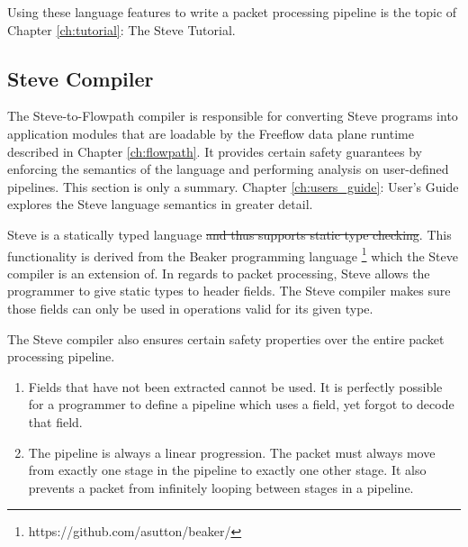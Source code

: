 Using these language features to write a packet processing pipeline is the topic of Chapter \ref{ch:tutorial}: The Steve Tutorial.

\subsection{Steve Compiler}

The Steve-to-Flowpath compiler is responsible for converting Steve programs into application modules that are loadable by the Freeflow data plane runtime \cite{freeflow_software} described in Chapter \ref{ch:flowpath}. It provides certain safety guarantees by enforcing the semantics of the language and performing analysis on user-defined pipelines. This section is only a summary. Chapter \ref{ch:users_guide}: User's Guide explores the Steve language semantics in greater detail.

Steve is a statically typed language \sout{and thus supports static type checking}. This functionality is derived from the Beaker programming language \footnote{https://github.com/asutton/beaker/} which the Steve compiler is an extension of. In regards to packet processing, Steve allows the programmer to give static types to header fields. The Steve compiler makes sure those fields can only be used in operations valid for its given type.

The Steve compiler also ensures certain safety properties over the entire packet processing pipeline.

\begin{enumerate}
\item Fields that have not been extracted cannot be used. It is perfectly possible for a programmer to define a pipeline which uses a field, yet forgot to decode that field.

\item The pipeline is always a linear progression. The packet must always move from exactly one stage in the pipeline to exactly one other stage. It also prevents a packet from infinitely looping between stages in a pipeline.
\end{enumerate}
